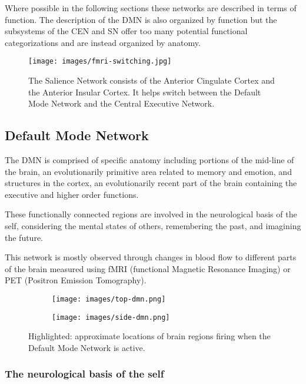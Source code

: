 \documentclass[a4paper, amsfonts, amssymb, amsmath, reprint, showkeys, nofootinbib, twoside]{revtex4-1}
\begin{document}
Where possible in the following sections these networks are described in terms of
function. The description of the DMN is also organized by function but the subsystems
of the CEN and SN offer too many potential functional categorizations and are instead
organized by anatomy.

\begin{figure}[H]
  \centering
  \texttt{[image: images/fmri-switching.jpg]}
  \caption{The Salience Network consists of the Anterior Cingulate Cortex and the
    Anterior Insular Cortex. It helps switch between the Default Mode Network and the
  Central Executive Network.}
  \label{fig:fmri-switching}
\end{figure}

\subsection{Default Mode Network}

The DMN is comprised of specific anatomy including portions of the mid-line of the
brain, an evolutionarily primitive area related to memory and emotion, and
structures in the cortex, an evolutionarily recent part of the brain containing the
executive and higher order functions. \cite{defaultnetworkanatomy}

These functionally connected regions are involved in the neurological basis
of the self, considering the mental states of others, remembering the past, and
imagining the future.

This network is mostly observed through changes in blood flow to different parts of
the brain measured using fMRI (functional Magnetic Resonance Imaging) or
PET (Positron Emission Tomography). \cite{defaultnetworkadaptive}

\begin{figure}[h!]
  \centering
  \begin{subfigure}[b]{0.48\linewidth}
    \texttt{[image: images/top-dmn.png]}
  \end{subfigure}
  \begin{subfigure}[b]{0.48\linewidth}
    \texttt{[image: images/side-dmn.png]}
  \end{subfigure}
  \caption{Highlighted: approximate locations of brain regions firing when the Default Mode Network is active.}
  \label{fig:dmn}
\end{figure}

\subsubsection{The neurological basis of the self}
\end{document}

